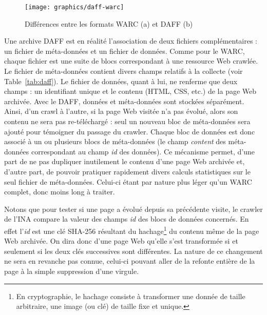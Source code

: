 \documentclass[symmetric,justified,marginals=raggedouter]{tufte-book}
\begin{document}
\begin{figure*}%
  \texttt{[image: graphics/daff-warc]}
  \caption{Différences entre les formats WARC (a) et DAFF (b)}
  \label{fig:daff-warc}
\end{figure*}

\noindent Une archive DAFF est en réalité l'association de deux fichiers complémentaires : un fichier de méta-données et un fichier de données. Comme pour le WARC, chaque fichier est une suite de blocs correspondant à une ressource Web crawlée. Le fichier de méta-données contient divers champs relatifs à la collecte (voir Table~\ref{tab:daff}). Le fichier de données, quant à lui, ne renferme que deux champs : un identifiant unique et le contenu (HTML, CSS, etc.) de la page Web archivée. Avec le DAFF, données et méta-données sont stockées séparément. Ainsi, d'un crawl à l'autre, si la page Web visitée n'a pas évolué, alors son contenu ne sera pas re-téléchargé : seul un nouveau bloc de méta-données sera ajouté pour témoigner du passage du crawler. Chaque bloc de données est donc associé à un ou plusieurs blocs de méta-données (le champ \textit{content} des méta-données correspondant au champ \textit{id} des données). Ce mécanisme permet, d'une part de ne pas dupliquer inutilement le contenu d'une page Web archivée et, d'autre part, de pouvoir pratiquer rapidement divers calculs statistiques sur le seul fichier de méta-données. Celui-ci étant par nature plus léger qu'un WARC complet, donc moins long à traiter.

Notons que pour tester si une page a évolué depuis sa précédente visite, le crawler de l'INA compare la valeur des champs \textit{id} des blocs de données concernés. En effet l'\textit{id} est une clé SHA-256 résultant du hachage\footnote{\RaggedOuter En cryptographie, le hachage consiste à transformer une donnée de taille arbitraire, une image (ou clé) de taille fixe et unique.} du contenu même de la page Web archivée. On dira donc d'une page Web qu'elle s'est transformée si et seulement si les deux clés successives sont différentes. La nature de ce changement ne sera en revanche pas connue, celui-ci pouvant aller de la refonte entière de la page à la simple suppression d'une virgule.        
\end{document}
